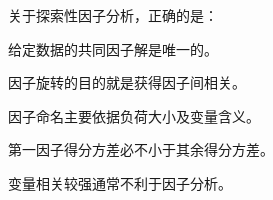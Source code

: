\par\addvspace{6pt}\noindent\begin{minipage}{\linewidth}


关于探索性因子分析，正确的是：


\begin{choices}

\item 给定数据的共同因子解是唯一的。

\item 因子旋转的目的就是获得因子间相关。

\item 因子命名主要依据负荷大小及变量含义。

\item 第一因子得分方差必不小于其余得分方差。

\item 变量相关较强通常不利于因子分析。

\end{choices}

\end{minipage}\par\vspace{4pt}

